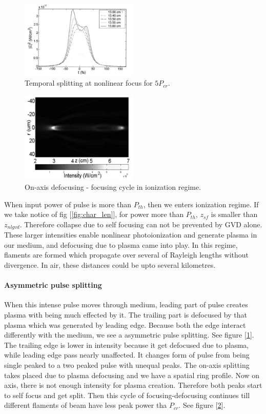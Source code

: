 \documentclass[../main.tex]{subfiles}
\begin{document}
	\begin{figure} [h]
		\includegraphics[width=0.5\textwidth]{images/split_ion.png}
		\caption{Temporal splitting at nonlinear focus for $5P_{cr}$.
		\label{fig:split_ion}}
	\end{figure}

	\begin{figure} [h]
		\includegraphics[width=0.5\textwidth]{images/filament1.png}
		\caption{On-axis defocusing - focusing cycle in ionization
			regime.
		\label{fig:fila_ion}}
	\end{figure}

	When input power of pulse is more than $P_{th}$, then we enters ionization
	regime. If we take notice of fig [\ref{fig:char_len}], for power more
	than $P_{th}$, $z_{sf}$ is smaller than $z_{nlgvd}$. Therefore collapse
	due to self focusing can not be prevented by GVD alone.
	These larger intensities enable nonlinear photoionization and
	generate plasma in our medium, and defocusing due to plasma came into
	play.
	In this regime, flaments are formed which propagate over several of
	Rayleigh lengths without divergence. In air, these distances could be
	upto several kilometres.


	\paragraph{\textbf{Asymmetric pulse splitting}}
	When this intense pulse moves through medium, leading part of pulse
	creates plasma with being much effected by it. The trailing part is
	defocused by that plasma which was generated by leading edge. Because
	both the edge interact differently with the medium, we see a asymmetric
	pulse splitting. See figure [\ref{fig:split_ion}].
	The trailing edge is lower in intensity because it get defocused due to
	plasma, while leading edge pass nearly unaffected. It changes form of
	pulse from being single peaked to a two peaked pulse with unequal peaks.
	The on-axis splitting takes placed due to plasma defocusing and we have
	a spatial ring profile. Now on axis, there is not enough intensity for
	plasma creation. Therefore both peaks start to self focus and get split.
	Then this cycle of focusing-defocusing continues till different flaments
	of beam have less peak power tha $P_{cr}$. See figure
	[\ref{fig:fila_ion}].
\end{document}
